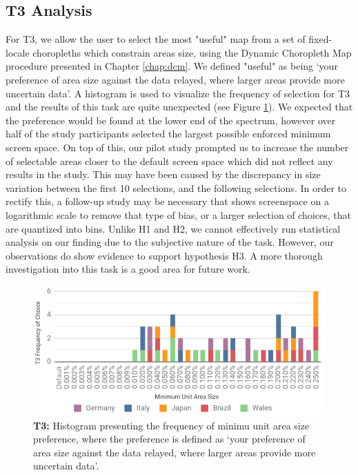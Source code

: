 \subsection{T3 Analysis}
For T3, we allow the user to select the most "useful" map from a set of fixed-locale choropleths which constrain areas size, using the Dynamic Choropleth Map procedure presented in Chapter \ref{chap:dcm}. We defined "useful" as being `your preference of area size against the data relayed, where larger areas provide more uncertain data'. A histogram is used to visualize the frequency of selection for T3 and the results of this task are quite unexpected (see Figure \ref{fig:t3results}).  We expected that the preference would be found at the lower end of the spectrum, however over half of the study participants selected the largest possible enforced minimum screen space. On top of this, our pilot study prompted us to increase the number of selectable areas closer to the default screen space which did not reflect any results in the study. This may have been caused by the discrepancy in size variation between the first 10 selections, and the following selections. In order to rectify this, a follow-up study may be necessary that shows screenspace on a logarithmic scale to remove that type of bias, or a larger selection of choices, that are quantized into bins. Unlike H1 and H2, we cannot effectively run statistical analysis on our finding due to the subjective nature of the task. However, our observations do show evidence to support hypothesis H3. A more thorough investigation into this task is a good area for future work.
\begin{figure}[t]
\centering
\includegraphics[width=1\linewidth]{images/T3}
\caption{\textbf{T3:} Histogram presenting the frequency of minimu unit area size preference, where the preference is defined as `your preference of area size against the data relayed, where larger areas provide more uncertain data'.} \label{fig:t3results} \vspace{-0.8cm}
\end{figure}

